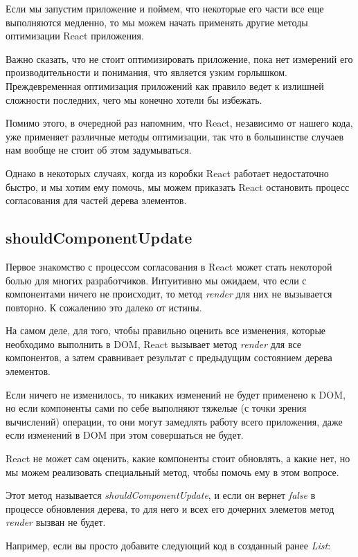 Если мы запустим приложение и поймем, что некоторые его части все еще выполняются медленно, то мы можем начать применять другие методы оптимизации React приложения.

Важно сказать, что не стоит оптимизировать приложение, пока нет измерений его производительности и понимания, что является узким горлышком. Преждевременная оптимизация приложений как правило ведет к излишней сложности последних, чего мы конечно хотели бы избежать. 

Помимо этого, в очередной раз напомним, что React, независимо от нашего кода, уже применяет различные методы оптимизации, так что в большинстве случаев нам вообще не стоит об этом задумываться.

Однако в некоторых случаях, когда из коробки React работает недостаточно быстро, и мы хотим ему помочь, мы можем приказать React остановить процесс согласования для частей дерева элементов.

\subsection{shouldComponentUpdate}

Первое знакомство с процессом согласования в React может стать некоторой болью для многих разработчиков. Интуитивно мы ожидаем, что если с компонентами ничего не происходит, то метод \textit{render} для них не вызывается повторно. К сожалению это далеко от истины.

На самом деле, для того, чтобы правильно оценить все изменения, которые необходимо выполнить в DOM, React вызывает метод \textit{render} для все компонентов, а затем сравнивает результат с предыдущим состоянием дерева элементов.

Если ничего не изменилось, то никаких изменений не будет применено к DOM, но если компоненты сами по себе выполняют тяжелые (с точки зрения вычислений) операции, то они могут замедлять работу всего приложения, даже если изменений в DOM при этом совершаться не будет.

React не может сам оценить, какие компоненты стоит обновлять, а какие нет, но мы можем реализовать специальный метод, чтобы помочь ему в этом вопросе.

Этот метод называется \textit{shouldComponentUpdate}, и если он вернет \textit{false} в процессе обновления дерева, то для него и всех его дочерних элеметов метод \textit{render} вызван не будет.


Например, если вы просто добавите следующий код в созданный ранее \textit{List}:

